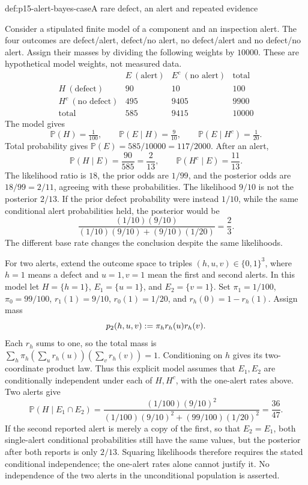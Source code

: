 \begin{hbexample}{def:p15-alert-bayes-case}{A rare defect, an alert and repeated evidence}
\par\nobreak
Consider a stipulated finite model of a component and an inspection alert.
The four outcomes are defect/alert, defect/no alert, no defect/alert and
no defect/no alert. Assign their masses by dividing the following weights
by \(10000\). These are hypothetical model weights, not measured data.
\[
\begin{array}{c|rr|r}
 &E\ (\text{alert})&E^c\ (\text{no alert})&\text{total}\\\hline
 H\ (\text{defect})&90&10&100\\
 H^c\ (\text{no defect})&495&9405&9900\\\hline
 \text{total}&585&9415&10000
\end{array}
\]
The model gives
\[
 \mathbb P(H)=\tfrac1{100},\qquad
 \mathbb P(E\mid H)=\tfrac9{10},\qquad
 \mathbb P(E\mid H^c)=\tfrac1{20}.
\]
Total probability gives \(\mathbb P(E)=585/10000=117/2000\).
After an alert,
\[
 \mathbb P(H\mid E)=\frac{90}{585}=\frac2{13},\qquad
 \mathbb P(H^c\mid E)=\frac{11}{13}.
\]
The likelihood ratio is \(18\), the prior odds are \(1/99\), and the
posterior odds are \(18/99=2/11\), agreeing with these probabilities.
The likelihood \(9/10\) is not the posterior \(2/13\). If the prior
defect probability were instead \(1/10\), while the same conditional
alert probabilities held, the posterior would be
\[
 \frac{(1/10)(9/10)}{(1/10)(9/10)+(9/10)(1/20)}=\frac23.
\]
The different base rate changes the conclusion despite the same likelihoods.

For two alerts, extend the outcome space to triples
\((h,u,v)\in\{0,1\}^3\), where \(h=1\) means a defect and
\(u=1,v=1\) mean the first and second alerts. In this model let
\(H=\{h=1\}\), \(E_1=\{u=1\}\), and \(E_2=\{v=1\}\).
Set \(\pi_1=1/100\), \(\pi_0=99/100\),
\(r_1(1)=9/10\), \(r_0(1)=1/20\), and
\(r_h(0)=1-r_h(1)\). Assign mass
\[
 p_2(h,u,v)\mathrel{:=}\pi_h r_h(u)r_h(v).
\]
Each \(r_h\) sums to one, so the total mass is
\(\sum_h\pi_h(\sum_u r_h(u))(\sum_v r_h(v))=1\).
Conditioning on \(h\) gives its two-coordinate product law. Thus this
explicit model assumes that \(E_1,E_2\) are conditionally independent
under each of \(H,H^c\), with the one-alert rates above. Two alerts give
\[
 \mathbb P(H\mid E_1\cap E_2)
 =\frac{(1/100)(9/10)^2}
        {(1/100)(9/10)^2+(99/100)(1/20)^2}
 =\frac{36}{47}.
\]
If the second reported alert is merely a copy of the first, so that
\(E_2=E_1\), both single-alert conditional probabilities still have the
same values, but the posterior after both reports is only \(2/13\).
Squaring likelihoods therefore requires the stated conditional independence;
the one-alert rates alone cannot justify it. No independence of the two
alerts in the unconditional population is asserted.
\end{hbexample}

